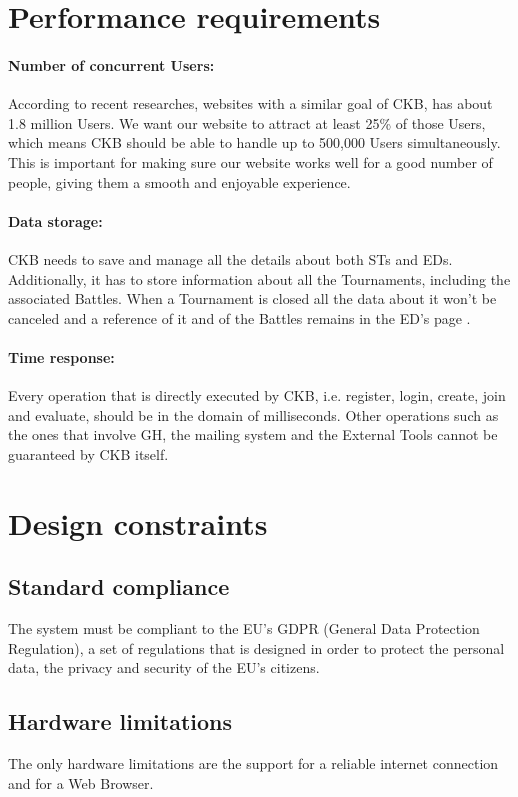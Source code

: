 \section{Performance requirements}
\label{sec:performance_requirements}%
\paragraph{Number of concurrent Users:} According to recent researches, websites with a similar goal of CKB, has about 1.8 million Users. We want our website to attract at least 25\% of those Users, which means CKB should be able to handle up to 500,000 Users simultaneously. This is important for making sure our website works well for a good number of people, giving them a smooth and enjoyable experience.
\paragraph{Data storage:} CKB needs to save and manage all the details about both STs and EDs. Additionally, it has to store information about all the Tournaments, including the associated Battles. When a Tournament is closed all the data about it won’t be canceled and a reference of it and of the Battles remains in the ED’s page .
\paragraph{Time response:} Every operation that is directly executed by CKB, i.e. register, login, create, join and evaluate, should be in the domain of milliseconds. Other operations such as the ones that involve GH, the mailing system and the External Tools cannot be guaranteed by CKB itself.


\newpage
\section{Design constraints}
\label{sec:design_constraints}%


\subsection{Standard compliance}
\label{subsec:standard compliance}%
The system must be compliant to the EU's GDPR (General Data Protection Regulation), a set of regulations that is designed in order to protect the personal data, the privacy and security of the EU's citizens. 


\subsection{Hardware limitations}
\label{subsec:hardware_limitations}%
The only hardware limitations are the support for a reliable internet connection and for a Web Browser.


